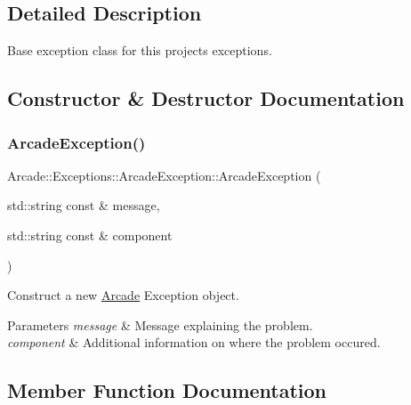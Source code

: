 \subsection{Detailed Description}
Base exception class for this projects\textquotesingle{} exceptions. 

\subsection{Constructor \& Destructor Documentation}
\mbox{\label{classArcade_1_1Exceptions_1_1ArcadeException_a054c4f79319af87bfbbe79fa03809b38}} 
\subsubsection{\texorpdfstring{ArcadeException()}{ArcadeException()}}
{\footnotesize\ttfamily Arcade\+::\+Exceptions\+::\+Arcade\+Exception\+::\+Arcade\+Exception (\begin{DoxyParamCaption}\item[{std\+::string const \&}]{message,  }\item[{std\+::string const \&}]{component }\end{DoxyParamCaption})}



Construct a new \mbox{\hyperlink{namespaceArcade}{Arcade}} Exception object. 


\begin{DoxyParams}{Parameters}
{\em message} & Message explaining the problem. \\
\hline
{\em component} & Additional information on where the problem occured. \\
\hline
\end{DoxyParams}


\subsection{Member Function Documentation}
\mbox{\label{classArcade_1_1Exceptions_1_1ArcadeException_aa000c618b4fbe4a3612f511074243ce9}} 
